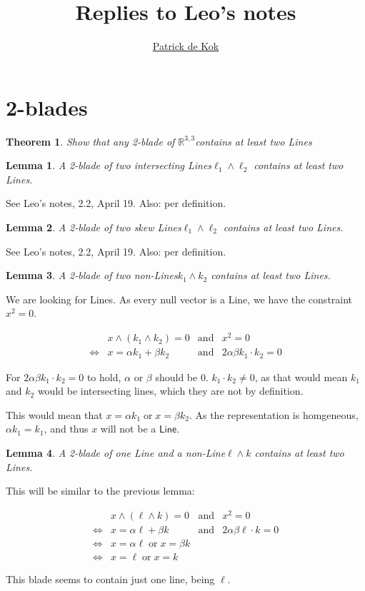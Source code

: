 \documentclass[a4paper,11pt,twoside,openright]{article}
\title{Replies to Leo's notes}
\author{\href{mailto:pkok@science.uva.nl}{Patrick de Kok}}
\newcommand{\textgt}[1]{\textsf{#1}}
\newcommand{\pLine}{\textgt{Line}\xspace}
\newcommand{\pLines}{\textgt{Line}s\xspace}
\newcommand{\Rl}{\ensuremath{\mathbb{R}^{3,3}}}
\newcommand{\en}{\ensuremath{\mathbin{\mbox{and}}}}
\newcommand{\of}{\ensuremath{\mathbin{\mbox{or}}}}
\newcommand{\eql}{\ensuremath{\Leftrightarrow}}
\newtheorem{theorem}{Theorem}
\newtheorem{lemma}{Lemma}
\begin{document}
\maketitle

\section{2-blades}
\begin{theorem}
Show that \emph{any} 2-blade of \Rl contains at least two \pLines
\end{theorem}

\begin{lemma}
A 2-blade of two intersecting \pLines $\ell_1 \wedge \ell_2$ contains at least two \pLines.
\end{lemma}
See Leo's notes, 2.2, April 19.  Also: per definition.

\begin{lemma}
A 2-blade of two skew \pLines $\ell_1 \wedge \ell_2$ contains at least two \pLines.
\end{lemma}
See Leo's notes, 2.2, April 19.  Also: per definition.

\begin{lemma}
A 2-blade of two non-\pLines $k_1 \wedge k_2$ contains at least two \pLines.
\end{lemma}

We are looking for \pLines. As every null vector is a \pLine, we have the constraint $x^2 = 0$.

\[
\begin{array}{rlcl}
 & x \wedge (k_1 \wedge k_2) = 0 &\en& x^2 = 0 \\
\eql& x = \alpha k_1 + \beta k_2 &\en& 2\alpha\beta k_1 \cdot k_2 = 0
\end{array}
\]

For $2\alpha\beta k_1 \cdot k_2 = 0$ to hold, $\alpha$ or $\beta$ should be 0. $k_1 \cdot k_2 \not= 0$, as that would mean $k_1$ and $k_2$ would be intersecting lines, which they are not by definition.

This would mean that $x = \alpha k_1 \of x = \beta k_2$. {\color{red}As the representation is homgeneous, $\alpha k_1 = k_1$, and thus $x$ will not be a $\pLine$.}

\begin{lemma}
A 2-blade of one \pLine and a non-\pLine $\ell \wedge k$ contains at least two \pLines.
\end{lemma}

This will be similar to the previous lemma:

\[
\begin{array}{rlcl}
 & x \wedge (\ell \wedge k) = 0 &\en& x^2 = 0 \\
\eql& x = \alpha \ell + \beta k &\en& 2\alpha\beta \ell \cdot k = 0 \\
\eql& x = \alpha \ell \of x = \beta k \\
\eql& x = \ell \of x = k
\end{array}
\]

{\color{red}This blade seems to contain just one line, being $\ell$.}
\end{document}

